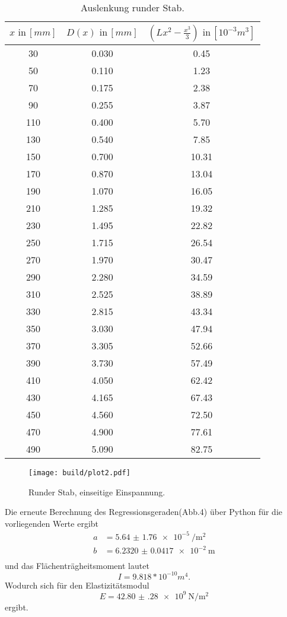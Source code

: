 \begin{table}[h]
  \centering
  \label{tab:lit3}
  \begin{tabular}{ c c c }
    \toprule
    $x \,\, \text{in} \, [mm]$
   &{$D(x) \,\, \text{in} \, [mm]$}
   &{$(Lx^2- \frac{x^3}{3}) \,\, \text{in} \, [10^{-3}m^3]$} \\

    \midrule
    30 & 0.030 & 0.45\\
    50 & 0.110 & 1.23\\
    70 & 0.175 & 2.38\\
    90 & 0.255 & 3.87\\
    110& 0.400 & 5.70\\
    130& 0.540 & 7.85\\
    150& 0.700 &10.31\\
    170& 0.870 &13.04\\
    190& 1.070 &16.05\\
    210& 1.285 &19.32\\
    230& 1.495 &22.82\\
    250& 1.715 &26.54\\
    270& 1.970 &30.47\\
    290& 2.280 &34.59\\
    310& 2.525 &38.89\\
    330& 2.815 &43.34\\
    350& 3.030 &47.94\\
    370& 3.305 &52.66\\
    390& 3.730 &57.49\\
    410& 4.050 &62.42\\
    430& 4.165 &67.43\\
    450& 4.560 &72.50\\
    470& 4.900 &77.61\\
    490& 5.090 &82.75\\

    \bottomrule
  \end{tabular}
  \caption{Auslenkung runder Stab.}
\end{table}

\begin{figure}[h]
  \centering
  \texttt{[image: build/plot2.pdf]}
  \caption{Runder Stab, einseitige Einspannung.}
  \label{fig:plot2}
\end{figure}

Die erneute Berechnung des Regressionsgeraden(Abb.4) über Python
für die vorliegenden Werte ergibt
\begin{align*}
  a &= \SI{5.64(176)e-5}{\per\square\meter} \\
  b &= \SI{6.2320(417)e-2}{\meter} \\
\end{align*}
und das Flächenträgheitsmoment lautet
\begin{equation*}
  I = 9.818* 10^{-10} m^4.
\end{equation*}
\newline
Wodurch sich für den Elastizitätsmodul
\begin{equation*}
  E = \SI{42.80(28)e9}{\newton\per\square\meter}
\end{equation*}
ergibt.
\newpage
